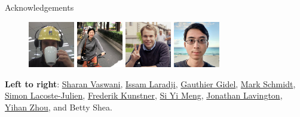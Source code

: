 \documentclass[mathserif,notheorems, hyperref={colorlinks, citecolor=blue, urlcolor=blue, linkcolor=blue}]{beamer}
\begin{document}
\begin{frame}{Acknowledgements}
\begin{figure}
            \includegraphics[width=0.18\textwidth]{collaborators/fred}
            \includegraphics[width=0.18\textwidth]{collaborators/cathy}
            \includegraphics[width=0.18\textwidth]{collaborators/wilder}
            \includegraphics[width=0.18\textwidth]{collaborators/joey}
        \end{figure}

        \textbf{Left to right}:
            \href{https://vaswanis.github.io/}{Sharan Vaswani}, \href{https://issamlaradji.github.io/}{Issam Laradji}, \href{https://gauthiergidel.github.io/}{Gauthier Gidel}, \href{https://www.cs.ubc.ca/~schmidtm/}{Mark Schmidt}, \href{http://www.iro.umontreal.ca/~slacoste/}{Simon Lacoste-Julien}, \href{https://fkunstner.github.io/}{Frederik Kunstner}, \href{https://www.cs.ubc.ca/~mengxixi/}{Si Yi Meng}, \href{https://wilderlavington.github.io/}{Jonathan Lavington}, \href{https://joeyandbluewhale.github.io/}{Yihan Zhou}, and Betty Shea. 
    
        \end{frame}
\end{document}
